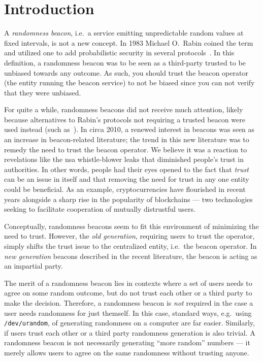 \section{Introduction}
A \emph{randomness beacon}, i.e.\ a service emitting unpredictable random values at fixed intervals, is not a new concept.
In 1983 Michael O.\ Rabin coined the term and utilized one to add probabilistic security in several protocols~\cite{rabin1983transaction}.
In this definition, a randomness beacon was to be seen as a third-party trusted to be unbiased towards any outcome.
As such, you should trust the beacon operator (the entity running the beacon service) to not be biased since you can not verify that they were unbiased.

For quite a while, randomness beacons did not receive much attention, likely because alternatives to Rabin's protocols not requiring a trusted beacon were used instead (such as~\cite{BGMR}).
In circa 2010, a renewed interest in beacons was seen as an increase in beacon-related literature; the trend in this new literature was to remedy the need to trust the beacon operator.
We believe it was a reaction to revelations like the \gls{nsa} whistle-blower leaks that diminished people's trust in authorities.
In other words, people had their eyes opened to the fact that \emph{trust} can be an issue in itself and that removing the need for trust in any one entity could be beneficial.
As an example, cryptocurrencies have flourished in recent years alongside a sharp rise in the popularity of blockchains --- two technologies seeking to facilitate cooperation of mutually distrustful users.

Conceptually, randomness beacons seem to fit this environment of minimizing the need to trust.
However, the \emph{old generation}, requiring users to trust the operator, simply shifts the trust issue to the centralized entity, i.e.\ the beacon operator.
In \emph{new generation} beacons described in the recent literature, the beacon is acting as an impartial party.

The merit of a randomness beacon lies in contexts where a set of users needs to agree on some random outcome, but do not trust each other or a third party to make the decision.
Therefore, a randomness beacon is \emph{not} required in the case a user needs randomness for just themself.
In this case, standard ways, e.g.\ using \texttt{/dev/urandom}, of generating randomness on a computer are far easier.
Similarly, if users trust each other or a third party randomness generation is also trivial.
A randomness beacon is not necessarily generating \enquote{more random} numbers --- it merely allows users to agree on the same randomness without trusting anyone.


